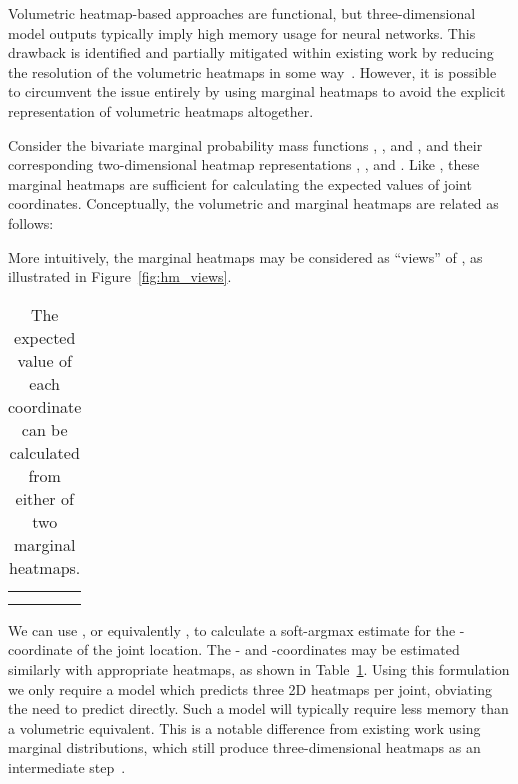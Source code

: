 \documentclass[australian,10pt,twocolumn,letterpaper,twocolumn]{article}
\makeatletter
\providecommand{\tabularnewline}{\\}
\renewcommand{\paragraph}{\@startsection{paragraph}{4}{\z@}{0.7ex \@plus 0.2ex \@minus 0.2ex}{-1em}{\normalfont\normalsize\bfseries}}
\makeatother
\begin{document}
\paragraph{Marginal heatmaps.}

Volumetric heatmap-based approaches are functional, but three-dimensional
model outputs typically imply high memory usage for neural networks.
This drawback is identified and partially mitigated within existing
work by reducing the resolution of the volumetric heatmaps in some
way~\citep{pavlakos2017coarse,luvizon20182d}. However, it is possible
to circumvent the issue entirely by using marginal heatmaps to avoid
the explicit representation of volumetric heatmaps altogether.

Consider the bivariate marginal probability mass functions ,
, and , and their corresponding two-dimensional
heatmap representations , ,
and . Like , these marginal
heatmaps are sufficient for calculating the expected values of joint
coordinates. Conceptually, the volumetric and marginal heatmaps are
related as follows:


More intuitively, the marginal heatmaps may be considered as ``views''
of , as illustrated in Figure~\ref{fig:hm_views}.

\begin{table}
\begin{centering}
\setlength\tabcolsep{4pt}
\renewcommand{\arraystretch}{2}\begin{tabular}{ccc}
 &  & \tabularnewline
\hline 
 &  & \tabularnewline
 &  & \tabularnewline
\end{tabular}
\par\end{centering}
\caption{\label{tbl:expectation_marginal_heatmaps}The expected value of each
coordinate can be calculated from either of two marginal heatmaps.}
\end{table}
We can use ,
or equivalently ,
to calculate a soft-argmax estimate for the -coordinate of the
joint location. The - and -coordinates may be estimated similarly
with appropriate heatmaps, as shown in Table~\ref{tbl:expectation_marginal_heatmaps}.
Using this formulation we only require a model which predicts three
2D heatmaps per joint, obviating the need to predict 
directly. Such a model will typically require less memory than a volumetric
equivalent. This is a notable difference from existing work using
marginal distributions, which still produce three-dimensional heatmaps
as an intermediate step~\citep{luvizon20182d,pavlakos2018ordinal}.
\end{document}
